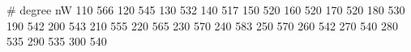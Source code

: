 # degree    nW
110     566
120     545
130     532
140     517
150     520
160     520
170     520
180     530
190     542
200     543
210     555
220     565
230     570
240     583
250     570
260     542
270     540
280     535
290     535
300     540
